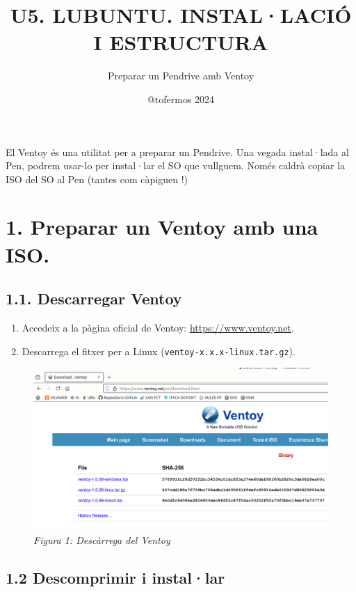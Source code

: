 \documentclass[
  a4paper,
]{article}
\title{U5. LUBUNTU. INSTAL·LACIÓ I ESTRUCTURA}
\subtitle{Preparar un Pendrive amb Ventoy}
\author{@tofermos 2024}
\date{}
\providecommand{\tightlist}{%
  \setlength{\itemsep}{0pt}\setlength{\parskip}{0pt}}
\begin{document}
\maketitle

{
\setcounter{tocdepth}{2}
\tableofcontents
}
El Ventoy és una utilitat per a preparar un Pendrive. Una vegada
instal·lada al Pen, podrem usar-lo per instal·lar el SO que vullguem.
Només caldrà copiar la ISO del SO al Pen (tantes com càpiguen !)

\newpage
\renewcommand\tablename{Tabla}

\section{1. Preparar un Ventoy amb una
ISO.}\label{preparar-un-ventoy-amb-una-iso.}

\subsection{1.1. Descarregar Ventoy}\label{descarregar-ventoy}

\begin{enumerate}
\def\labelenumi{\arabic{enumi}.}
\tightlist
\item
  Accedeix a la pàgina oficial de Ventoy: \url{https://www.ventoy.net}.
\item
  Descarrega el fitxer per a Linux (\texttt{ventoy-x.x.x-linux.tar.gz}).
\end{enumerate}

\begin{figure}
\centering
\includegraphics{png/DescarregaVentoy.png}
\caption{\emph{Figura 1: Descàrrega del Ventoy}}
\end{figure}

\subsection{1.2 Descomprimir i
instal·lar}\label{descomprimir-i-installar}
\end{document}
